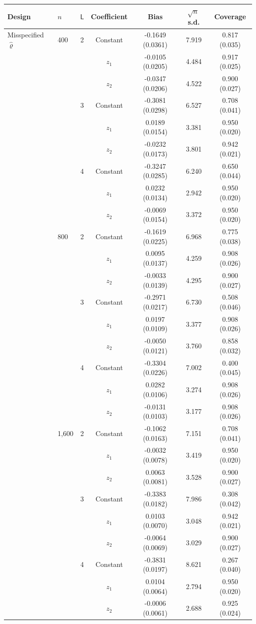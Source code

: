 \begin{tabular}{llccccc}
\toprule
Design & $n$ & $\mathsf L$ & Coefficient & Bias & $\sqrt{n}\,$s.d. & Coverage \\
\midrule
Misspecified $\hat\varrho$ & 400 & 2 & Constant & -0.1649 (0.0361) & 7.919 & 0.817 (0.035) \\
 &  &  & $z_1$ & -0.0105 (0.0205) & 4.484 & 0.917 (0.025) \\
 &  &  & $z_2$ & -0.0347 (0.0206) & 4.522 & 0.900 (0.027) \\
\addlinespace
 &  & 3 & Constant & -0.3081 (0.0298) & 6.527 & 0.708 (0.041) \\
 &  &  & $z_1$ & 0.0189 (0.0154) & 3.381 & 0.950 (0.020) \\
 &  &  & $z_2$ & -0.0232 (0.0173) & 3.801 & 0.942 (0.021) \\
\addlinespace
 &  & 4 & Constant & -0.3247 (0.0285) & 6.240 & 0.650 (0.044) \\
 &  &  & $z_1$ & 0.0232 (0.0134) & 2.942 & 0.950 (0.020) \\
 &  &  & $z_2$ & -0.0069 (0.0154) & 3.372 & 0.950 (0.020) \\
\addlinespace
 & 800 & 2 & Constant & -0.1619 (0.0225) & 6.968 & 0.775 (0.038) \\
 &  &  & $z_1$ & 0.0095 (0.0137) & 4.259 & 0.908 (0.026) \\
 &  &  & $z_2$ & -0.0033 (0.0139) & 4.295 & 0.900 (0.027) \\
\addlinespace
 &  & 3 & Constant & -0.2971 (0.0217) & 6.730 & 0.508 (0.046) \\
 &  &  & $z_1$ & 0.0197 (0.0109) & 3.377 & 0.908 (0.026) \\
 &  &  & $z_2$ & -0.0050 (0.0121) & 3.760 & 0.858 (0.032) \\
\addlinespace
 &  & 4 & Constant & -0.3304 (0.0226) & 7.002 & 0.400 (0.045) \\
 &  &  & $z_1$ & 0.0282 (0.0106) & 3.274 & 0.908 (0.026) \\
 &  &  & $z_2$ & -0.0131 (0.0103) & 3.177 & 0.908 (0.026) \\
\addlinespace
 & 1,600 & 2 & Constant & -0.1062 (0.0163) & 7.151 & 0.708 (0.041) \\
 &  &  & $z_1$ & -0.0032 (0.0078) & 3.419 & 0.950 (0.020) \\
 &  &  & $z_2$ & 0.0063 (0.0081) & 3.528 & 0.900 (0.027) \\
\addlinespace
 &  & 3 & Constant & -0.3383 (0.0182) & 7.986 & 0.308 (0.042) \\
 &  &  & $z_1$ & 0.0103 (0.0070) & 3.048 & 0.942 (0.021) \\
 &  &  & $z_2$ & -0.0064 (0.0069) & 3.029 & 0.900 (0.027) \\
\addlinespace
 &  & 4 & Constant & -0.3831 (0.0197) & 8.621 & 0.267 (0.040) \\
 &  &  & $z_1$ & 0.0104 (0.0064) & 2.794 & 0.950 (0.020) \\
 &  &  & $z_2$ & -0.0006 (0.0061) & 2.688 & 0.925 (0.024) \\
\bottomrule
\end{tabular}

